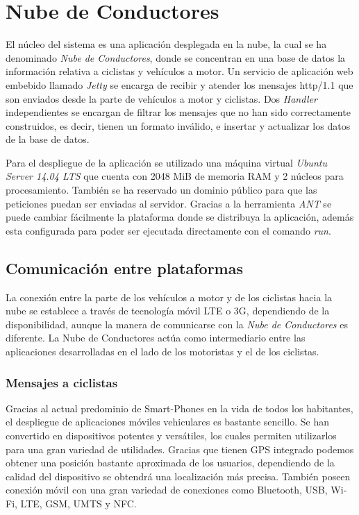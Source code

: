 \section{Nube de Conductores}\label{section:NubeConductores}
El núcleo del sistema es una aplicación desplegada en la nube, la cual se ha denominado \emph{Nube de Conductores}, donde se concentran en una base de datos la información relativa a ciclistas y vehículos a motor. Un servicio de aplicación web embebido llamado \emph{Jetty} se encarga de recibir y atender los mensajes \Gls{http/1.1} que son enviados desde la parte de vehículos a motor y ciclistas. Dos \emph{Handler} independientes se encargan de filtrar los mensajes que no han sido correctamente construidos, es decir, tienen un formato inválido, e insertar y actualizar los datos de la base de datos.

Para el despliegue de la aplicación se utilizado una máquina virtual \emph{Ubuntu Server 14.04 LTS} que cuenta con 2048 MiB de memoria RAM y 2 n\'ucleos para procesamiento. También se ha reservado un dominio público para que las peticiones puedan ser enviadas al servidor. Gracias a la herramienta \emph{ANT} se puede cambiar fácilmente la plataforma donde se distribuya la aplicación, además esta configurada para poder ser ejecutada directamente con el comando \emph{run}.


\subsection{Comunicación entre plataformas}\label{ssection:comunicacion_plataformas}
La conexión entre la parte de los vehículos a motor y de los ciclistas hacia la nube se establece a través de tecnología móvil \gls{LTE} o \gls{3G}, dependiendo de la disponibilidad, aunque la manera de comunicarse con la \emph{Nube de Conductores} es diferente. La Nube de Conductores actúa como intermediario entre las aplicaciones desarrolladas en el lado de los motoristas y el de los ciclistas.

\subsubsection{Mensajes a ciclistas}\label{sssection:mensajes_ciclistas}
Gracias al actual predominio de Smart-Phones en la vida de todos los habitantes, el despliegue de aplicaciones móviles vehiculares es bastante sencillo. Se han convertido en dispositivos potentes y versátiles, los cuales permiten utilizarlos para una gran variedad de utilidades. Gracias que tienen GPS integrado podemos obtener una posición bastante aproximada de los usuarios, dependiendo de la calidad del dispositivo se obtendrá una localización más precisa. También poseen conexión móvil con una gran variedad de conexiones como Bluetooth, USB, Wi-Fi, LTE, GSM, UMTS y NFC.

